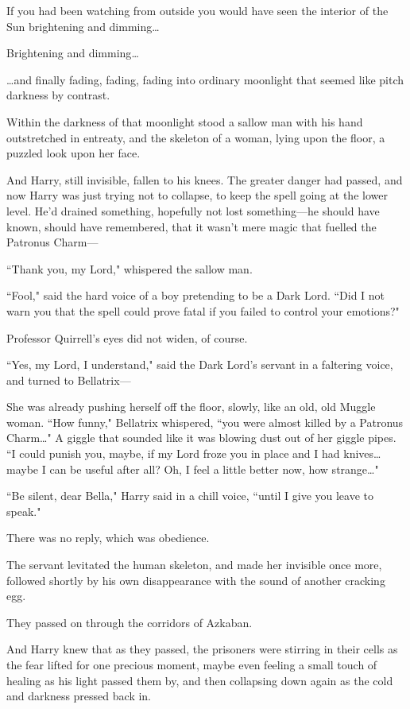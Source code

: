 If you had been watching from outside you would have seen the interior of the Sun brightening and dimming{\ldots}

Brightening and dimming{\ldots}

{\ldots}and finally fading, fading, fading into ordinary moonlight that seemed like pitch darkness by contrast.

Within the darkness of that moonlight stood a sallow man with his hand outstretched in entreaty, and the skeleton of a woman, lying upon the floor, a puzzled look upon her face.

And Harry, still invisible, fallen to his knees. The greater danger had passed, and now Harry was just trying not to collapse, to keep the spell going at the lower level. He'd drained something, hopefully not lost something—he should have known, should have remembered, that it wasn't mere magic that fuelled the Patronus Charm—

``Thank you, my Lord," whispered the sallow man.

``Fool," said the hard voice of a boy pretending to be a Dark Lord. ``Did I not warn you that the spell could prove fatal if you failed to control your emotions?"

Professor Quirrell's eyes did not widen, of course.

``Yes, my Lord, I understand," said the Dark Lord's servant in a faltering voice, and turned to Bellatrix—

She was already pushing herself off the floor, slowly, like an old, old Muggle woman. ``How funny," Bellatrix whispered, ``you were almost killed by a Patronus Charm{\ldots}" A giggle that sounded like it was blowing dust out of her giggle pipes. ``I could punish you, maybe, if my Lord froze you in place and I had knives{\ldots} maybe I can be useful after all? Oh, I feel a little better now, how strange{\ldots}"

``Be silent, dear Bella," Harry said in a chill voice, ``until I give you leave to speak."

There was no reply, which was obedience.

The servant levitated the human skeleton, and made her invisible once more, followed shortly by his own disappearance with the sound of another cracking egg.

They passed on through the corridors of Azkaban.

And Harry knew that as they passed, the prisoners were stirring in their cells as the fear lifted for one precious moment, maybe even feeling a small touch of healing as his light passed them by, and then collapsing down again as the cold and darkness pressed back in.

